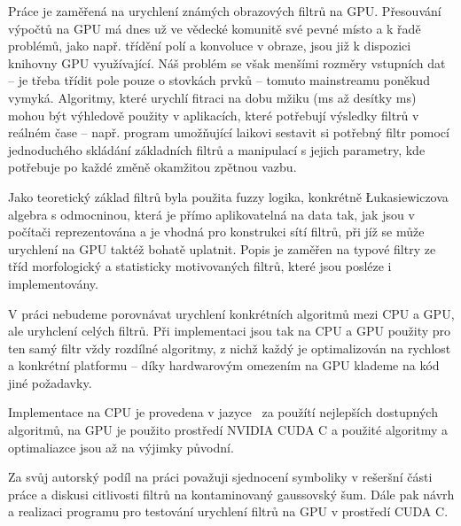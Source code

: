 


Práce je zaměřená na urychlení známých obrazových filtrů na GPU. Přesouvání výpočtů na GPU má dnes už ve vědecké komunitě své pevné místo a k řadě problémů, jako např. třídění polí a konvoluce v obraze, jsou již k dispozici knihovny GPU využívající. Náš problém se však menšími rozměry vstupních dat -- je třeba třídit pole pouze o stovkách prvků -- tomuto mainstreamu poněkud vymyká. Algoritmy, které urychlí fitraci na dobu mžiku (ms až desítky ms) mohou být výhledově použity v aplikacích, které potřebují výsledky filtrů v reálném čase -- např. program umožňující laikovi sestavit si potřebný filtr pomocí jednoduchého skládání základních filtrů a manipulací s jejich parametry, kde potřebuje po každé změně okamžitou zpětnou vazbu.

Jako teoretický základ filtrů byla použita fuzzy logika, konkrétně \L ukasiewiczova algebra s odmocninou, která je přímo aplikovatelná na data tak, jak jsou v počítači reprezentována a je vhodná pro konstrukci sítí filtrů, při jíž se může urychlení na GPU taktéž bohatě uplatnit.
Popis je zaměřen na typové filtry ze tříd morfologický a statisticky motivovaných filtrů, které jsou posléze i implementovány.

V práci nebudeme porovnávat urychlení konkrétních algoritmů mezi CPU a GPU, ale uryhclení celých filtrů. Při implementaci jsou tak na CPU a GPU použity pro ten samý filtr vždy rozdílné algoritmy, z nichž každý je optimalizován na rychlost a konkrétní platformu -- díky hardwarovým omezením na GPU klademe na kód jiné požadavky.

Implementace na CPU je provedena v jazyce \Cpp ~za použítí nejlepších dostupných algoritmů, na GPU je použito prostředí NVIDIA CUDA C a použité algoritmy a optimaliazce jsou až na výjimky původní. 

Za svůj autorský podíl na práci považuji sjednocení symboliky v rešeršní části práce a diskusi citlivosti filtrů na kontaminovaný gaussovský šum. Dále pak návrh a realizaci programu pro testování urychlení filtrů na GPU v prostředí CUDA C.
